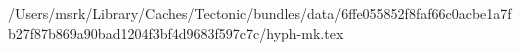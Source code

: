 /Users/msrk/Library/Caches/Tectonic/bundles/data/6ffe055852f8faf66c0acbe1a7fb27f87b869a90bad1204f3bf4d9683f597c7c/hyph-mk.tex
